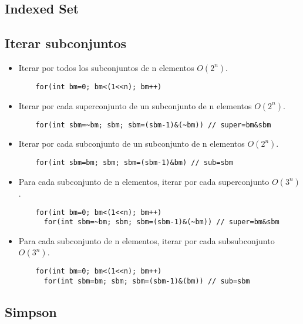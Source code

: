 \documentclass[a4paper,11pt,landscape,twocolumn]{article}
\begin{document}


\subsection{Indexed Set}



\subsection{Iterar subconjuntos}

\begin{itemize}
  \item Iterar por todos los subconjuntos de n elementos $O(2^n)$.
  \begin{lstlisting}
    for(int bm=0; bm<(1<<n); bm++)
  \end{lstlisting}

  \item Iterar por cada superconjunto de un subconjunto de n elementos $O(2^n)$.
  \begin{lstlisting}
    for(int sbm=~bm; sbm; sbm=(sbm-1)&(~bm)) // super=bm&sbm
  \end{lstlisting}

  \item Iterar por cada subconjunto de un subconjunto de n elementos $O(2^n)$.
  \begin{lstlisting}
    for(int sbm=bm; sbm; sbm=(sbm-1)&bm) // sub=sbm
  \end{lstlisting}

  \item Para cada subconjunto de n elementos, iterar por cada superconjunto $O(3^n)$.
  \begin{lstlisting}
    for(int bm=0; bm<(1<<n); bm++)
      for(int sbm=~bm; sbm; sbm=(sbm-1)&(~bm)) // super=bm&sbm
  \end{lstlisting}

  \item Para cada subconjunto de n elementos, iterar por cada subsubconjunto $O(3^n)$.
  \begin{lstlisting}
    for(int bm=0; bm<(1<<n); bm++)
      for(int sbm=bm; sbm; sbm=(sbm-1)&(bm)) // sub=sbm
  \end{lstlisting}
\end{itemize}

\subsection{Simpson}


\end{document}
